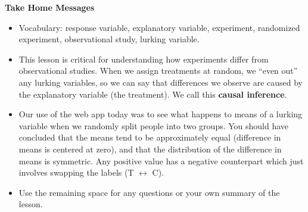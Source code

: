 \begin{center}
  {\bf Take Home Messages}
\end{center}
  \begin{itemize}
  \item Vocabulary:  response variable, explanatory variable,
    experiment, randomized experiment, observational study, lurking
    variable.
  \item This lesson is critical for understanding how experiments
    differ from observational studies.  When we assign treatments at
    random, we ``even out'' any lurking variables, so we can say that
    differences we observe are caused by the explanatory variable (the
    treatment). We call this {\bf causal inference}.
  \item  Our use of the web app today was to see what happens to means
    of a lurking variable when we randomly split people into two
    groups. You should have concluded that the means tend to be
    approximately equal (difference in means is centered at zero), and
    that the distribution of the difference in means is symmetric. Any
    positive value has a negative counterpart which just involves
    swapping the labels (T $\longleftrightarrow$ C).

 \item 
  Use the remaining space for any questions or your own summary of the
  lesson. 
  \end{itemize}
  



